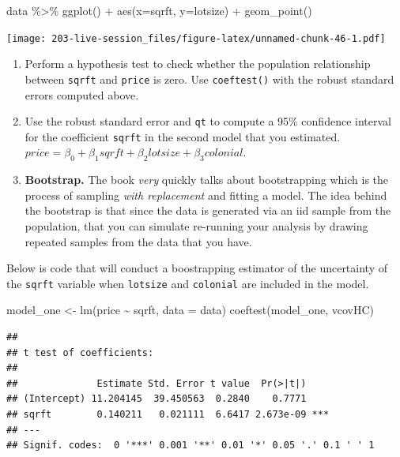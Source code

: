 \documentclass[
]{book}
\newenvironment{Shaded}{\begin{snugshade}}{\end{snugshade}}
\newcommand{\AttributeTok}[1]{\textcolor[rgb]{0.77,0.63,0.00}{#1}}
\newcommand{\FunctionTok}[1]{\textcolor[rgb]{0.00,0.00,0.00}{#1}}
\newcommand{\NormalTok}[1]{#1}
\newcommand{\OtherTok}[1]{\textcolor[rgb]{0.56,0.35,0.01}{#1}}
\newcommand{\SpecialCharTok}[1]{\textcolor[rgb]{0.00,0.00,0.00}{#1}}
\theoremstyle{definition}
\theoremstyle{definition}
\theoremstyle{definition}
\theoremstyle{definition}
\theoremstyle{remark}
\begin{document}
\begin{Shaded}
\begin{Highlighting}[]
\NormalTok{data }\SpecialCharTok{\%\textgreater{}\%} 
  \FunctionTok{ggplot}\NormalTok{() }\SpecialCharTok{+} 
  \FunctionTok{aes}\NormalTok{(}\AttributeTok{x=}\NormalTok{sqrft, }\AttributeTok{y=}\NormalTok{lotsize) }\SpecialCharTok{+} 
  \FunctionTok{geom\_point}\NormalTok{()}
\end{Highlighting}
\end{Shaded}

\texttt{[image: 203-live-session\_files/figure-latex/unnamed-chunk-46-1.pdf]}

\begin{enumerate}
\def\labelenumi{\arabic{enumi}.}
\setcounter{enumi}{2}
\item
  Perform a hypothesis test to check whether the population relationship between \texttt{sqrft} and \texttt{price} is zero. Use \texttt{coeftest()} with the robust standard errors computed above.
\item
  Use the robust standard error and \texttt{qt} to compute a 95\% confidence interval for the coefficient \texttt{sqrft} in the second model that you estimated. \(price = \beta_{0} + \beta_{1} sqrft + \beta_{2} lotsize + \beta_{3} colonial\).
\item
  \textbf{Bootstrap.} The book \emph{very} quickly talks about bootstrapping which is the process of sampling \emph{with replacement} and fitting a model. The idea behind the bootstrap is that since the data is generated via an iid sample from the population, that you can simulate re-running your analysis by drawing repeated samples from the data that you have.
\end{enumerate}

Below is code that will conduct a boostrapping estimator of the uncertainty of the \texttt{sqrft} variable when \texttt{lotsize} and \texttt{colonial} are included in the model.

\begin{Shaded}
\begin{Highlighting}[]
\NormalTok{model\_one }\OtherTok{\textless{}{-}} \FunctionTok{lm}\NormalTok{(price }\SpecialCharTok{\textasciitilde{}}\NormalTok{ sqrft, }\AttributeTok{data =}\NormalTok{ data)}
\FunctionTok{coeftest}\NormalTok{(model\_one, vcovHC)}
\end{Highlighting}
\end{Shaded}

\begin{verbatim}
## 
## t test of coefficients:
## 
##              Estimate Std. Error t value  Pr(>|t|)    
## (Intercept) 11.204145  39.450563  0.2840    0.7771    
## sqrft        0.140211   0.021111  6.6417 2.673e-09 ***
## ---
## Signif. codes:  0 '***' 0.001 '**' 0.01 '*' 0.05 '.' 0.1 ' ' 1
\end{verbatim}
\end{document}
